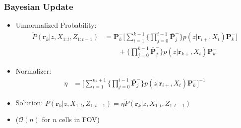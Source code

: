 \documentclass[11pt,professionalfonts,hyperref={pdftex,pdfpagemode=none,pdfstartview=FitH}]{beamer}
\renewcommand{\emph}[1]{\textit{\textbf{\color{blue}{#1}}}}
\begin{document}
\begin{frame}
\begin{figure}
\begin{subfigure}[t]{.45\linewidth}
  \end{subfigure}
\end{figure}





\end{frame}




\begin{frame}
\frametitle{Bayesian Update}

\begin{itemize}
	\item Unnormalized Probability:
	\begin{align*}
\tilde P(\mathbf{r}_{k}|z,X_{1:t},Z_{1:t-1})
&=\mathbf{P}_k^-
\bigg[\sum_{i=1}^{k-1}\bigg\{\prod_{j=0}^{i-1}\bar{\mathbf{P}}_j^-\bigg\}p(z|\mathbf{r}_{i+},X_t)\mathbf{P}_k^-\bigg]\nonumber\\
&\qquad + \bigg\{\prod_{j=0}^{k-1}\bar{\mathbf{P}}_j^-\bigg\}p(z|\mathbf{r}_{k+},X_t)\mathbf{P}_k^-
\end{align*}
	\item Normalizer:
	\begin{align*}
\label{eqn:allEta}
\eta
&=
\bigg[\sum_{i=1}^{n_{r}+1}\bigg\{\prod_{j=0}^{i-1}\bar{\mathbf{P}}_j^-\bigg\} p(z|\mathbf{r}_{i+},X_t)\mathbf{P}_k^-\bigg]^{-1}
\end{align*}
	\item Solution: $P(\mathbf{r}_{k}|z,X_{1:t},Z_{1:t-1})=\eta\tilde P(\mathbf{r}_{k}|z,X_{1:t},Z_{1:t-1})$
	\item \emph{Linear Complexity} ($\mathcal{O}(n)$ for \emph{all} $n$ cells in FOV)
\end{itemize}
\end{frame}
\end{document}
